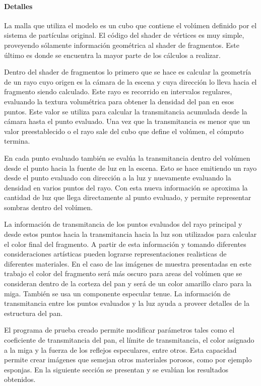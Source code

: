 \documentclass[oneside,a4paper,english,links]{amca}
\begin{document}
\paragraph{Detalles}

La malla que utiliza el modelo es un cubo que contiene el volúmen
definido por el sistema de partículas original. El código del shader
de vértices es muy simple, proveyendo sólamente información geométrica
al shader de fragmentos. Este último es donde se encuentra la mayor
parte de los cálculos a realizar.

Dentro del shader de fragmentos lo primero que se hace es calcular la
geometría de un rayo cuyo origen es la cámara de la escena y cuya
dirección lo lleva hacia el fragmento siendo calculado. Este rayo es
recorrido en intervalos regulares, evaluando la textura volumétrica
para obtener la densidad del pan en esos puntos. Este valor se utiliza
para calcular la transmitancia acumulada desde la cámara hasta el
punto evaluado. Una vez que la transmitancia es menor que un valor
preestablecido o el rayo sale del cubo que define el volúmen, el
cómputo termina.

En cada punto evaluado también se evalúa la transmitancia dentro del
volúmen desde el punto hacia la fuente de luz en la escena. Esto se
hace emitiendo un rayo desde el punto evaluado con dirección a la luz
y nuevamente evaluando la densidad en varios puntos del rayo. Con esta
nueva información se aproxima la cantidad de luz que llega
directamente al punto evaluado, y permite representar sombras dentro
del volúmen.

La información de transmitancia de los puntos evaluados del rayo
principal y desde estos puntos hacia la transmitancia hacia la luz son
utilizados para calcular el color final del fragmento. A partir de
esta información y tomando diferentes consideraciones artísticas
pueden lograrse representaciones realisticas de diferentes
materiales. En el caso de las imágenes de muestra presentadas en este
trabajo el color del fragmento será más oscuro para areas del volúmen
que se consideran dentro de la corteza del pan y será de un color
amarillo claro para la miga. También se usa un componente especular
tenue. La información de transmitancia entre los puntos evaluados y la
luz ayuda a proveer detalles de la estructura del pan.

El programa de prueba creado permite modificar parámetros tales como
el coeficiente de transmitancia del pan, el límite de transmitancia,
el color asignado a la miga y la fuerza de los reflejos especulares,
entre otros. Esta capacidad permite crear imágenes que semejan otros
materiales porosos, como por ejemplo esponjas. En la siguiente sección
se presentan y se evalúan los resultados obtenidos.
\end{document}
